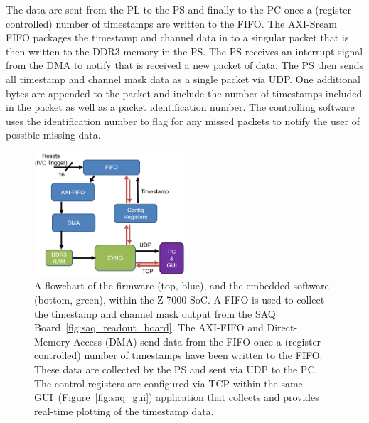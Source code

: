 The data are sent from the PL to the PS and finally to the PC once a (register controlled) number of timestamps are written to the FIFO.
The AXI-Sream FIFO packages the timestamp and channel data in to a singular packet that is then written to the DDR3 memory in the PS.
The PS receives an interrupt signal from the DMA to notify that is received a new packet of data.
The PS then sends all timestamp and channel mask data as a single packet via UDP.
One additional bytes are appended to the packet and include the number of timestamps included in the packet as well as a packet identification number.
The controlling software uses the identification number to flag for any missed packets to notify the user of possible missing data.

\begin{figure}[]
\centering
\includegraphics[width=0.5\textwidth]{images/saq_daq_firmware_summary.png}
\caption{A flowchart of the firmware (top, blue), and the embedded software (bottom, green), within the Z-7000 SoC.
A FIFO is used to collect the timestamp and channel mask output from the SAQ Board~\ref{fig:saq_readout_board}.
The AXI-FIFO and Direct-Memory-Access (DMA) send data from the FIFO once a (register controlled) number of timestamps have been written to the FIFO.
These data are collected by the PS and sent via UDP to the PC.
The control registers are configured via TCP within the same GUI~(Figure~\ref{fig:saq_gui}) application that collects and provides real-time plotting of the timestamp data.
}
\label{fig:saq_firmware}
\end{figure}


